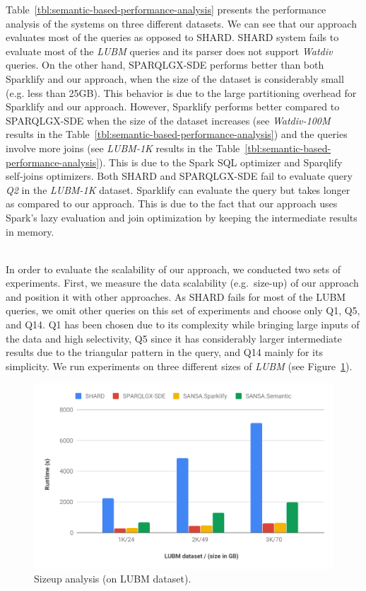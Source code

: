Table~\ref{tbl:semantic-based-performance-analysis} presents the performance analysis of the systems on three different datasets.
We can see that our approach evaluates most of the queries as opposed to SHARD.
SHARD system fails to evaluate most of the \textit{LUBM} queries and its parser does not support \textit{Watdiv} queries.
On the other hand, SPARQLGX-SDE performs better than both Sparklify and our approach, when the size of the dataset is considerably small (e.g. less than 25GB).
This behavior is due to the large partitioning overhead for Sparklify and our approach.
However, Sparklify performs better compared to SPARQLGX-SDE when the size of the dataset increases (see \textit{Watdiv-100M} results in the Table~\ref{tbl:semantic-based-performance-analysis}) and the queries involve more joins (see \textit{LUBM-1K} results in the Table~\ref{tbl:semantic-based-performance-analysis}).
This is due to the Spark SQL optimizer and Sparqlify self-joins optimizers.
Both SHARD and SPARQLGX-SDE fail to evaluate query \textit{Q2} in the \textit{LUBM-1K} dataset. 
Sparklify can evaluate the query but takes longer as compared to our approach.
This is due to the fact that our approach uses Spark's lazy evaluation and join optimization by keeping the intermediate results in memory.

~\\
In order to evaluate the scalability of our approach, we conducted two sets of experiments.
First, we measure the data scalability (e.g.\ size-up) of our approach and position it with other approaches.
As SHARD fails for most of the LUBM queries, we omit other queries on this set of experiments and choose only Q1, Q5, and Q14.
Q1 has been chosen due to its complexity while bringing large inputs of the data and high selectivity, Q5 since it has considerably larger intermediate results due to the triangular pattern in the query, and Q14 mainly for its simplicity.
We run experiments on three different sizes of \textit{LUBM} (see Figure~\ref{fig:semantic-based-sizeup-scalability}).

\begin{figure}
 \includegraphics[width=1.0\columnwidth]{images/6_scalable_rdf_querying/semantic-based-sizeup-scalability.pdf}
    \caption{Sizeup analysis (on LUBM dataset).}
    \label{fig:semantic-based-sizeup-scalability}
\end{figure}

